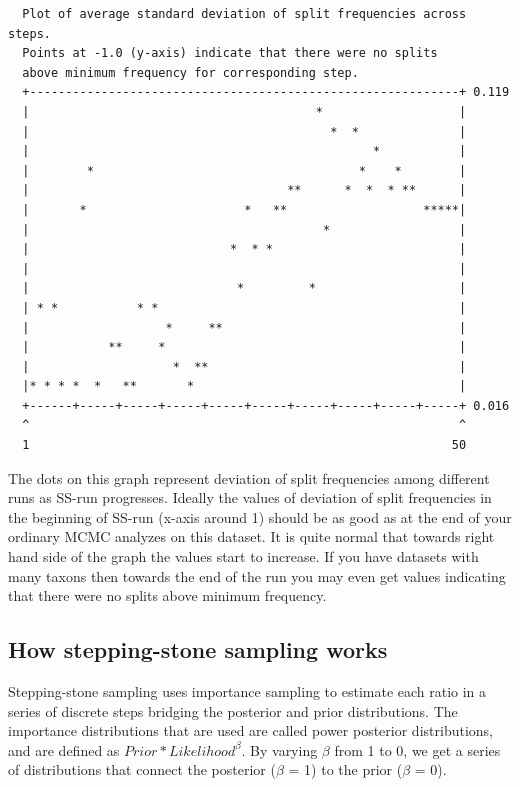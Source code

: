 \documentclass[12pt]{book}
\begin{document}
\begin{singlespacing}
\footnotesize
\begin{verbatim}
  Plot of average standard deviation of split frequencies across steps.
  Points at -1.0 (y-axis) indicate that there were no splits
  above minimum frequency for corresponding step.
  +------------------------------------------------------------+ 0.119
  |                                        *                   |
  |                                          *  *              |
  |                                                *           |
  |        *                                     *    *        |
  |                                    **      *  *  * **      |
  |       *                      *   **                   *****|
  |                                         *                  |
  |                            *  * *                          |
  |                                                            |
  |                             *         *                    |
  | * *           * *                                          |
  |                   *     **                                 |
  |           **     *                                         |
  |                    *  **                                   |
  |* * * *  *   **       *                                     |
  +------+-----+-----+-----+-----+-----+-----+-----+-----+-----+ 0.016
  ^                                                            ^
  1                                                           50
\end{verbatim}
\end{singlespacing}
\normalsize

The dots on this graph represent deviation of split frequencies among different runs as SS-run
progresses. Ideally the values of deviation of split frequencies in the beginning of SS-run (x-axis
around 1) should be as good as at the end of your ordinary MCMC analyzes on this dataset. It is
quite normal that towards right hand side of the graph the values start to increase. If you have
datasets with many taxons then towards the end of the run you may even get  values indicating that
there were no splits above minimum frequency.

\subsection{How stepping-stone sampling works}

Stepping-stone sampling uses importance sampling to estimate each ratio in a series of discrete
steps bridging the posterior and prior distributions. The importance distributions that are used
are called power posterior distributions, and are defined as $Prior*Likelihood^{\beta}$. By varying
$\beta$ from 1 to 0, we get a series of distributions that connect the posterior ($\beta$ = 1) to
the prior ($\beta$ = 0).
\end{document}

